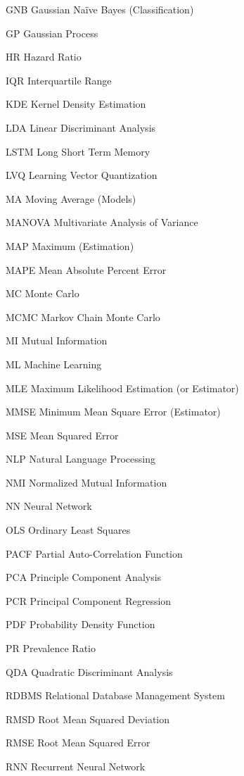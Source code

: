 \begin{symbollist}
  \item[GNB] Gaussian N{a\"i}ve Bayes (Classification)
  \item[GP] Gaussian Process
  \item[HR] Hazard Ratio
  \item[IQR] Interquartile Range
  \item[KDE] Kernel Density Estimation
  \item[LDA] Linear Discriminant Analysis
  \item[LSTM] Long Short Term Memory
  \item[LVQ] Learning Vector Quantization
  \item[MA] Moving Average (Models)
  \item[MANOVA] Multivariate Analysis of Variance
  \item[MAP] Maximum \aposteriori (Estimation)
  \item[MAPE] Mean Absolute Percent Error
  \item[MC] Monte Carlo
  \item[MCMC] Markov Chain Monte Carlo
  \item[MI] Mutual Information
  \item[ML] Machine Learning
  \item[MLE] Maximum Likelihood Estimation (or Estimator)
  \item[MMSE] Minimum Mean Square Error (Estimator)
  \item[MSE] Mean Squared Error
  \item[NLP] Natural Language Processing
  \item[NMI] Normalized Mutual Information
  \item[NN] Neural Network
  \item[OLS] Ordinary Least Squares
  \item[PACF] Partial Auto-Correlation Function
  \item[PCA] Principle Component Analysis
  \item[PCR] Principal Component Regression
  \item[PDF] Probability Density Function
  \item[PR] Prevalence Ratio
  \item[QDA] Quadratic Discriminant Analysis
  \item[RDBMS] Relational Database Management System
  \item[RMSD] Root Mean Squared Deviation
  \item[RMSE] Root Mean Squared Error
  \item[RNN] Recurrent Neural Network

\end{symbollist}
